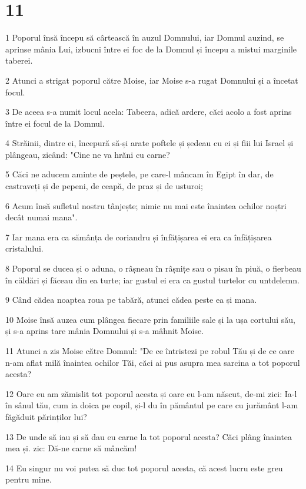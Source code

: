 \chapter{11}

\par 1 Poporul însă începu să cârtească în auzul Domnului, iar Domnul auzind, se aprinse mânia Lui, izbucni între ei foc de la Domnul și începu a mistui marginile taberei.
\par 2 Atunci a strigat poporul către Moise, iar Moise s-a rugat Domnului și a încetat focul.
\par 3 De aceea s-a numit locul acela: Tabeera, adică ardere, căci acolo a fost aprins între ei focul de la Domnul.
\par 4 Străinii, dintre ei, începură să-și arate poftele și ședeau cu ei și fiii lui Israel și plângeau, zicând: "Cine ne va hrăni cu carne?
\par 5 Căci ne aducem aminte de peștele, pe care-l mâncam în Egipt în dar, de castraveți și de pepeni, de ceapă, de praz și de usturoi;
\par 6 Acum însă sufletul nostru tânjește; nimic nu mai este înaintea ochilor noștri decât numai mana".
\par 7 Iar mana era ca sămânța de coriandru și înfățișarea ei era ca înfățișarea cristalului.
\par 8 Poporul se ducea și o aduna, o râșneau în râșnițe sau o pisau în piuă, o fierbeau în căldări și făceau din ea turte; iar gustul ei era ca gustul turtelor cu untdelemn.
\par 9 Când cădea noaptea roua pe tabără, atunci cădea peste ea și mana.
\par 10 Moise însă auzea cum plângea fiecare prin familiile sale și la ușa cortului său, și s-a aprins tare mânia Domnului și s-a mâhnit Moise.
\par 11 Atunci a zis Moise către Domnul: "De ce întristezi pe robul Tău și de ce oare n-am aflat milă înaintea ochilor Tăi, căci ai pus asupra mea sarcina a tot poporul acesta?
\par 12 Oare eu am zămislit tot poporul acesta și oare eu l-am născut, de-mi zici: Ia-l în sânul tău, cum ia doica pe copil, și-l du în pământul pe care cu jurământ l-am făgăduit părinților lui?
\par 13 De unde să iau și să dau eu carne la tot poporul acesta? Căci plâng înaintea mea și. zic: Dă-ne carne să mâncăm!
\par 14 Eu singur nu voi putea să duc tot poporul acesta, că acest lucru este greu pentru mine.
